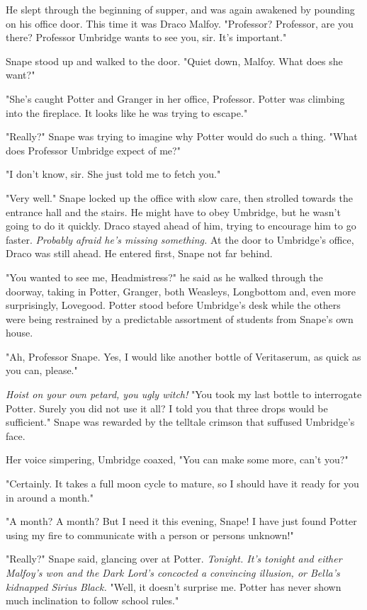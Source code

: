 He slept through the beginning of supper, and was again awakened by pounding on his office door. This time it was Draco Malfoy. "Professor? Professor, are you there? Professor Umbridge wants to see you, sir. It's important."

Snape stood up and walked to the door. "Quiet down, Malfoy. What does she want?"

"She's caught Potter and Granger in her office, Professor. Potter was climbing into the fireplace. It looks like he was trying to escape."

"Really?" Snape was trying to imagine why Potter would do such a thing. "What does Professor Umbridge expect of me?"

"I don't know, sir. She just told me to fetch you."

"Very well." Snape locked up the office with slow care, then strolled towards the entrance hall and the stairs. He might have to obey Umbridge, but he wasn't going to do it quickly. Draco stayed ahead of him, trying to encourage him to go faster. \emph{Probably afraid he's missing something.} At the door to Umbridge's office, Draco was still ahead. He entered first, Snape not far behind.

"You wanted to see me, Headmistress?" he said as he walked through the doorway, taking in Potter, Granger, both Weasleys, Longbottom and, even more surprisingly, Lovegood. Potter stood before Umbridge's desk while the others were being restrained by a predictable assortment of students from Snape's own house.

"Ah, Professor Snape. Yes, I would like another bottle of Veritaserum, as quick as you can, please."

\emph{Hoist on your own petard, you ugly witch!} "You took my last bottle to interrogate Potter. Surely you did not use it all? I told you that three drops would be sufficient." Snape was rewarded by the telltale crimson that suffused Umbridge's face.

Her voice simpering, Umbridge coaxed, "You can make some more, can't you?"

"Certainly. It takes a full moon cycle to mature, so I should have it ready for you in around a month."

"A month? A month? But I need it this evening, Snape! I have just found Potter using my fire to communicate with a person or persons unknown!"

"Really?" Snape said, glancing over at Potter. \emph{Tonight. It's tonight and either Malfoy's won and the Dark Lord's concocted a convincing illusion, or Bella's kidnapped Sirius Black.} "Well, it doesn't surprise me. Potter has never shown much inclination to follow school rules."

